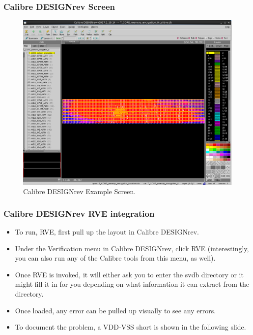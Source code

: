 \documentclass{beamer}
\begin{document}
\begin{frame}
\frametitle{Calibre DESIGNrev Screen}
\begin{center}
\begin{figure}
	\vspace{-0.1in}
\includegraphics[scale=0.2]{Fig/lvs2-5.png} 
\vspace{-0.1in}
\caption{Calibre DESIGNrev Example Screen.}
\end{figure}
\end{center}
\end{frame}
\begin{frame}[fragile]
\frametitle{Calibre DESIGNrev RVE integration}
\begin{itemize}
\item To run, RVE, first pull up the layout in Calibre DESIGNrev.
\item Under the Verification menu in Calibre DESIGNrev, click RVE
  (interestingly, you can also run any of the Calibre tools from this
  menu, as well).
\item Once RVE is invoked, it will either ask you to enter the
  svdb directory or it might fill it in for you depending on what
  information it can extract from the directory.
\item Once loaded, any error can be pulled up visually to see any
  errors.
\item To document the problem, a VDD-VSS short is shown in the
  following slide.
\end{itemize}
\end{frame}
\end{document}
